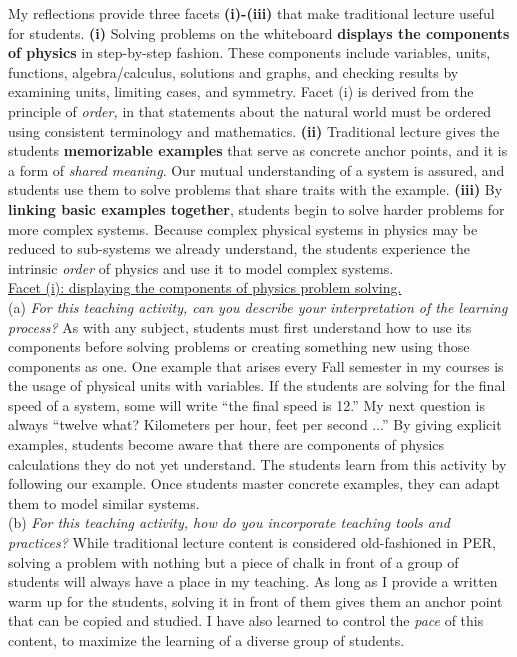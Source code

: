 \documentclass[../../../main.tex]{subfiles}
\begin{document}
My reflections provide three facets \textbf{(i)-(iii)} that make traditional lecture useful for students. \textbf{(i)} Solving problems on the whiteboard \textbf{displays the components of physics} in step-by-step fashion.  These components include variables, units, functions, algebra/calculus, solutions and graphs, and checking results by examining units, limiting cases, and symmetry.  Facet (i) is derived from the principle of \textit{order,} in that statements about the natural world must be ordered using consistent terminology and mathematics. \textbf{(ii)} Traditional lecture gives the students \textbf{memorizable examples} that serve as concrete anchor points, and it is a form of \textit{shared meaning}.  Our mutual understanding of a system is assured, and students use them to solve problems that share traits with the example.  \textbf{(iii)} By \textbf{linking basic examples together}, students begin to solve harder problems for more complex systems.  Because complex physical systems in physics may be reduced to sub-systems we already understand, the students experience the intrinsic \textit{order} of physics and use it to model complex systems.
\\
\vspace{0.25cm}
\underline{Facet (i): displaying the components of physics problem solving.}
\\
\vspace{0.25cm}
(a) \textit{For this teaching activity, can you describe your interpretation of the learning process?}  As with any subject, students must first understand how to use its components before solving problems or creating something new using those components as one.  One example that arises every Fall semester in my courses is the usage of physical units with variables.  If the students are solving for the final speed of a system, some will write ``the final speed is 12.''  My next question is always ``twelve what? Kilometers per hour, feet per second ...'' By giving explicit examples, students become aware that there are components of physics calculations they do not yet understand.  The students learn from this activity by following our example.  Once students master concrete examples, they can adapt them to model similar systems.
\\
\vspace{0.25cm}
(b) \textit{For this teaching activity, how do you incorporate teaching tools and practices?} While traditional lecture content is considered old-fashioned in PER, solving a problem with nothing but a piece of chalk in front of a group of students will always have a place in my teaching.  As long as I provide a written warm up for the students, solving it in front of them gives them an anchor point that can be copied and studied.  I have also learned to control the \textit{pace} of this content, to maximize the learning of a diverse group of students.
\end{document}
